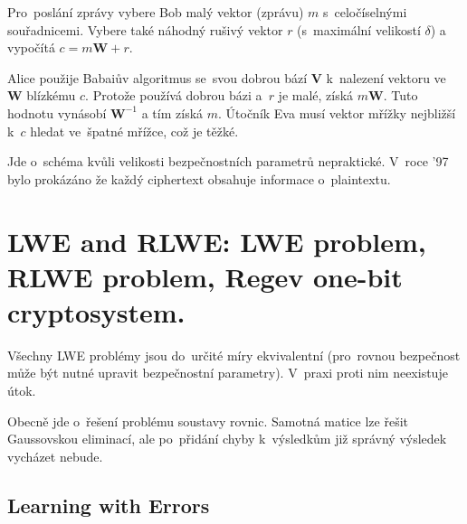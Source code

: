Pro~poslání zprávy vybere Bob malý vektor (zprávu) $m$ s~celočíselnými souřadnicemi.
Vybere také náhodný rušivý vektor $r$ (s~maximální velikostí $\delta$) a vypočítá
$c = m\textbf{W} + r$.

Alice použije Babaiův algoritmus se~svou dobrou bází $\textbf{V}$ k~nalezení vektoru ve~$\textbf{W}$ blízkému $c$.
Protože používá dobrou bázi a~$r$ je malé, získá $m\textbf{W}$.
Tuto hodnotu vynásobí $\textbf{W}^{-1}$ a tím získá $m$.
Útočník Eva musí vektor mřížky nejbližší k~$c$ hledat ve~špatné mřížce, což je těžké.

Jde o~schéma kvůli velikosti bezpečnostních parametrů nepraktické.
V~roce '97 bylo prokázáno že každý ciphertext obsahuje informace o~plaintextu.


\clearpage
\section{LWE and RLWE: LWE problem, RLWE problem, Regev one-bit cryptosystem.}

Všechny LWE problémy jsou do~určité míry ekvivalentní (pro~rovnou bezpečnost může být nutné upravit bezpečnostní parametry).
V~praxi proti nim neexistuje útok.

Obecně jde o~řešení problému soustavy rovnic.
Samotná matice lze řešit Gaussovskou eliminací, ale po~přidání chyby k~výsledkům již správný výsledek vycházet nebude.


\subsection{Learning with Errors}

